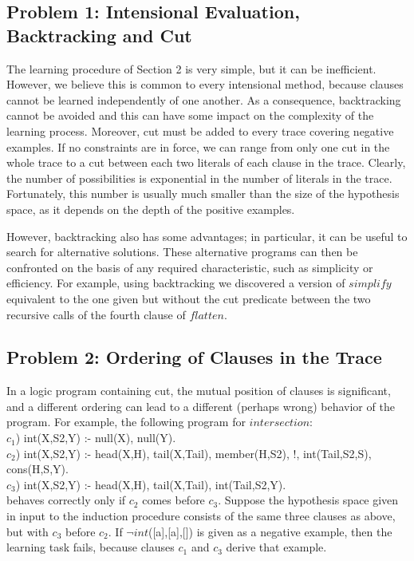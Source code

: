 \subsection{Problem 1: Intensional Evaluation, Backtracking and Cut}
The learning procedure of Section 2 is very simple, but it can be 
inefficient. However, we believe this is common to every intensional
method, because clauses cannot be 
learned independently of one another.
As a consequence,
backtracking cannot be avoided and this can have some impact
on the complexity of the learning process.
Moreover, cut must be added to every trace covering negative examples.
If no constraints are in force, we can range from only one cut in the
whole trace to a cut between each two literals of each clause in the trace.
Clearly, the number of possibilities is exponential in the number of
literals in the trace. Fortunately, this number is usually much smaller than
the size of the hypothesis space, as it depends on the depth of the 
positive examples.
 
However, backtracking also has some advantages; in particular,
it can be useful
to search for alternative solutions.
These alternative programs can then be confronted
on the basis of any required characteristic, such as simplicity
or efficiency.
For example, using backtracking we discovered a version of $simplify$
equivalent to the one given but without the cut predicate between the
two recursive calls of the fourth clause of $flatten$.
 
\subsection{Problem 2: Ordering of Clauses in the Trace} 
In a logic program containing cut, the mutual position of clauses
is significant, and a different ordering can lead to
a different (perhaps wrong) behavior of the program.
For example, the following program for $intersection$:\\
 
\noindent
$c_1$) int(X,S2,Y) :- null(X), null(Y).\\
$c_2$) int(X,S2,Y) :- head(X,H), tail(X,Tail), 
member(H,S2), !, int(Tail,S2,S), cons(H,S,Y).\\
$c_3$) int(X,S2,Y) :- head(X,H), tail(X,Tail), int(Tail,S2,Y).\\
 
\noindent
behaves correctly only if $c_2$ comes before $c_3$. Suppose the
hypothesis space given in input to the induction procedure 
consists of the same three clauses as above, but with $c_3$
before $c_2$. If $\neg$$int$([a],[a],[]) is given as a negative
example, then the learning task fails, because clauses $c_1$ and
$c_3$ derive that example.
 
